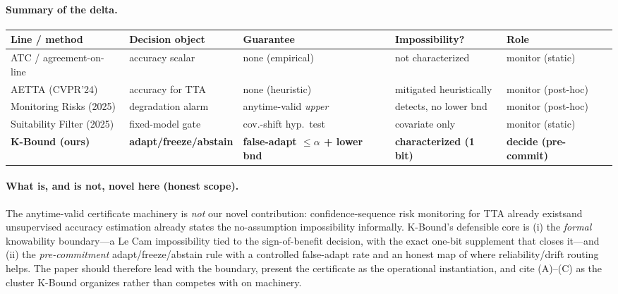 \paragraph{Summary of the delta.}
\begin{center}
\small
\begin{tabular}{lllll}
\hline
\textbf{Line / method} & \textbf{Decision object} & \textbf{Guarantee} & \textbf{Impossibility?} & \textbf{Role} \\
\hline
ATC / agreement-on-line & accuracy scalar & none (empirical) & not characterized & monitor (static) \\
AETTA (CVPR'24) & accuracy for TTA & none (heuristic) & mitigated heuristically & monitor (post-hoc) \\
Monitoring Risks (2025) & degradation alarm & anytime-valid \emph{upper} & detects, no lower bnd & monitor (post-hoc) \\
Suitability Filter (2025) & fixed-model gate & cov.-shift hyp.\ test & covariate only & monitor (static) \\
\textbf{K-Bound (ours)} & \textbf{adapt/freeze/abstain} & \textbf{false-adapt $\le\alpha$ + lower bnd} & \textbf{characterized (1 bit)} & \textbf{decide (pre-commit)} \\
\hline
\end{tabular}
\end{center}

\paragraph{What is, and is not, novel here (honest scope).}
The anytime-valid certificate machinery is \emph{not} our novel contribution:
confidence-sequence risk monitoring for TTA already exists\footnotemark[\value{footnote}]
and unsupervised accuracy estimation already states the
no-assumption impossibility informally. K-Bound's defensible core is (i) the
\emph{formal} knowability boundary---a Le Cam impossibility tied to the
sign-of-benefit decision, with the exact one-bit supplement that closes it---and (ii)
the \emph{pre-commitment} adapt/freeze/abstain rule with a controlled false-adapt
rate and an honest map of where reliability/drift routing helps. The paper should
therefore lead with the boundary, present the certificate as the operational
instantiation, and cite (A)--(C) as the cluster K-Bound organizes rather than
competes with on machinery.
